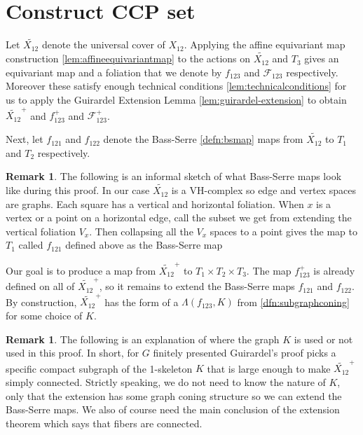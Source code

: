 \documentclass[12pt,parskip=full]{report}
\theoremstyle{plain}
\theoremstyle{definition}
\newtheorem{rmk}[thm]{Remark}
\begin{document}
\section{Construct CCP set}

        Let \(\widetilde {X_{12}}\) denote the universal cover of \(X_{12}\).  Applying the affine equivariant map construction \ref{lem:affineequivariantmap} to the actions on \(\widetilde {X_{12}}\) and \(T_{3}\) gives an equivariant  map and a foliation that we denote by \(f_{123}\) and \(\mathscr{F}_{123}\) respectively. Moreover these satisfy enough technical conditions 
        \ref{lem:technicalconditions} for us to apply the Guirardel Extension Lemma \ref{lem:guirardel-extension} to obtain \(\widetilde{X_{12}}^{+}\) and \(f_{123}^{+}\) and \(\mathscr{F}_{123}^{+}\).

        Next, let  \(f_{121}\) and  \(f_{122}\)  denote the Bass-Serre \ref{defn:bsmap} maps from \(\widetilde {X_{12}}\) to \(T_{1}\) and \(T_{2}\) respectively. 
        
        \begin{rmk}
            
        The following is an informal sketch of what Bass-Serre maps look like during this proof. In our case \(\widetilde {X_{12}}\) is a VH-complex so edge and vertex spaces are graphs. Each square has a vertical and horizontal foliation. When $x$ is a vertex or a point on a horizontal edge, call the subset we get from extending the vertical foliation $V_x$. Then collapsing all the $V_x$ spaces to a point gives the map to $T_1$ called \(f_{121}\) defined above as the Bass-Serre map
        \end{rmk}
        
        Our goal is to produce a map from \(\widetilde {X_{12}}^+\) to \(T_1\times T_2\times T_3\). The map \(f_{123}^+\) is already defined on all of \(\widetilde {X_{12}}^+\), so it remains to extend the Bass-Serre maps \(f_{121}\) and \(f_{122}\). By construction, \(\widetilde {X_{12}}^+\) has the form of a \(\Lambda(f_{123}, K)\) from \ref{dfn:subgraphconing} for some choice of \(K\).
        
        \begin{rmk}
            The following is an explanation of where the graph \(K\) is used or not used in this proof. In short, for \(G\) finitely presented Guirardel's proof picks a specific compact subgraph of the 1-skeleton \(K\) that is large enough to make \(\widetilde {X_{12}}^+\) simply connected. Strictly speaking, we do not need to know the nature of \(K\), only that the extension has some graph coning structure so we can extend the Bass-Serre maps. We also of course need the main conclusion of the extension theorem which says that fibers are connected.
        \end{rmk}
        
\end{document}
